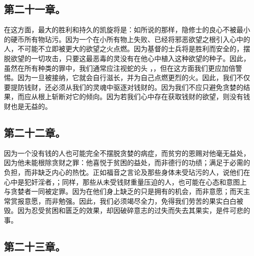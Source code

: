 
\subsection{第二十一章。}

\par

在这方面，最大的胜利和持久的凯旋将是：如所说的那样，隐修士的良心不被最小的硬币所有物玷污。因为一个在小所有物上失败、已经将邪恶欲望之根引入心中的人，不可能不立即被更大的欲望之火点燃。因为基督的士兵将是胜利而安全的，摆脱欲望的一切攻击，只要这最恶毒的灵没有在他心中植入这种欲望的种子。因此，虽然在所有种类的罪中，我们通常应注视蛇的头 ，，但在这方面我们更应加倍警惕。因为一旦被接纳，它就会自行滋长，并为自己点燃更烈的火。因此，我们不仅要提防钱财，还必须从我们的灵魂中驱逐对钱财的。因为我们不应只避免贪婪的结果，而应从根上斩断对它的倾向。因为若我们心中存在获取钱财的欲望，则没有钱财也是无益的。\par


\subsection{第二十二章。}

\par

因为一个没有钱的人也可能完全不摆脱贪婪的病症，而贫穷的恩赐对他毫无益处，因为他未能根除贪财之罪：他喜悦于贫困的益处，而非德行的功绩；满足于必需的负担，而非缺乏内心的热忱。正如福音之言论及那些身体未受玷污的人，说他们在心中是犯奸淫者，；同样，那些从未受钱财重量压迫的人，也可能在心态和意图上与贪婪者一同被定罪。因为在他们身上缺乏的只是拥有的机会，而非意愿；而天主常赏报意愿，而非勉强。因此，我们必须竭尽全力，免得我们劳苦的果实白白被毁。因为忍受贫困和匮乏的效果，却因破碎意志的过失而失去其果实，是件可悲的事。\par


\subsection{第二十三章。}

